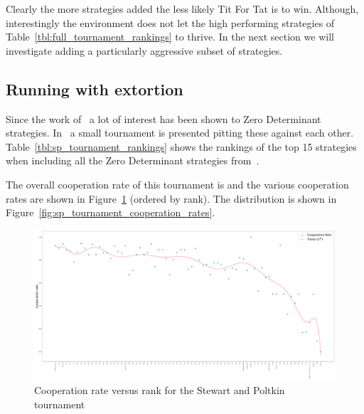 \documentclass{article}
\begin{document}

\begin{table}[!hbtp]
        \centering
        
        \caption{Proportion of winners of the original tournament with 1, 2 or 3
        new strategies}
        \label{tbl:alternate_extra_strategy_tournament_winner_proportion}
\end{table}

Clearly the more strategies added the less likely Tit For Tat is to win.
Although, interestingly the environment does not let the high performing
strategies of Table~\ref{tbl:full_tournament_rankings} to thrive. In the
next section we will investigate adding a particularly aggressive subset of
strategies.

\subsection{Running with extortion}\label{sec:run_with_stewart_plotkin}

Since the work of~\cite{Press2012} a lot of interest has been shown to Zero
Determinant strategies. In~\cite{Stewart2012} a small tournament is presented
pitting these against each other. Table~\ref{tbl:sp_tournament_rankings}
shows the rankings of the top 15 strategies when including all the Zero
Determinant strategies from~\cite{Stewart2012}.

\begin{table}[!hbtp]
        \centering
        \scriptsize
        
        \caption{Top 15 strategies in the tournament composed of the original
                 strategies and the Zero Determinant strategies
                 from~\cite{Stewart2012}}
        \label{tbl:sp_tournament_rankings}
\end{table}

The overall cooperation rate of this tournament is
and the various
cooperation rates are shown in
Figure~\ref{fig:sp_tournament_cooperation_rate_versus_rank} (ordered by rank).
The distribution is shown in Figure~\ref{fig:sp_tournament_cooperation_rates}.

\begin{figure}[!hbtp]
    \centering
    \includegraphics[width=.8\textwidth]{assets/sp_tournament_cooperation_rate_versus_rank.pdf}
    \caption{Cooperation rate versus rank for the Stewart and Poltkin tournament}
    \label{fig:sp_tournament_cooperation_rate_versus_rank}
\end{figure}
\end{document}
